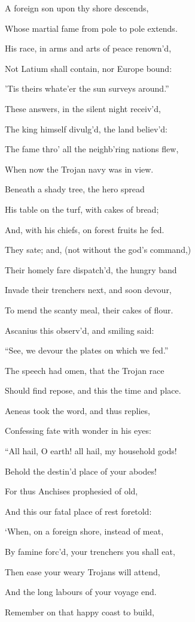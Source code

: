 A foreign son upon thy shore descends,

Whose martial fame from pole to pole extends.

His race, in arms and arts of peace renown’d,

Not Latium shall contain, nor Europe bound:

’Tis theirs whate’er the sun surveys around.”

These answers, in the silent night receiv’d,

The king himself divulg’d, the land believ’d:

The fame thro’ all the neighb’ring nations flew,

When now the Trojan navy was in view.

Beneath a shady tree, the hero spread

His table on the turf, with cakes of bread;

And, with his chiefs, on forest fruits he fed.

They sate; and, (not without the god’s command,)

Their homely fare dispatch’d, the hungry band

Invade their trenchers next, and soon devour,

To mend the scanty meal, their cakes of flour.

Ascanius this observ’d, and smiling said:

“See, we devour the plates on which we fed.”

The speech had omen, that the Trojan race

Should find repose, and this the time and place.

Aeneas took the word, and thus replies,

Confessing fate with wonder in his eyes:

“All hail, O earth! all hail, my household gods!

Behold the destin’d place of your abodes!

For thus Anchises prophesied of old,

And this our fatal place of rest foretold:

‘When, on a foreign shore, instead of meat,

By famine forc’d, your trenchers you shall eat,

Then ease your weary Trojans will attend,

And the long labours of your voyage end.

Remember on that happy coast to build,

